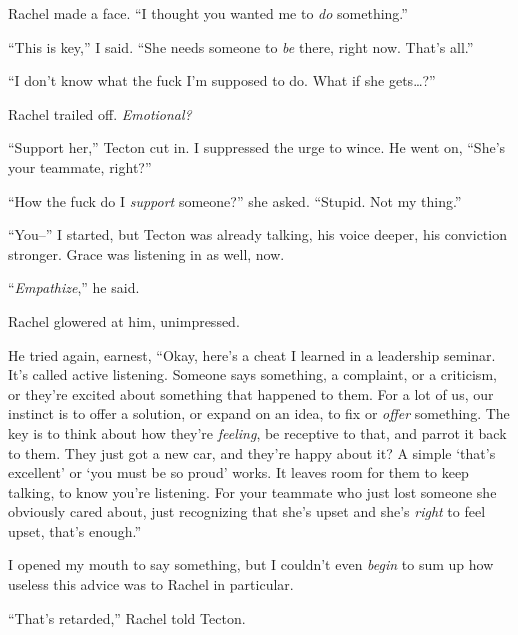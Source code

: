 Rachel made a face.  ``I thought you wanted me to \emph{do} something.''



``This is key,'' I said.  ``She needs someone to \emph{be} there, right now.  That's all.''



``I don't know what the fuck I'm supposed to do.  What if she gets\ldots?''



Rachel trailed off.  \emph{Emotional?}



``Support her,'' Tecton cut in.  I suppressed the urge to wince.  He went on, ``She's your teammate, right?''



``How the fuck do I \emph{support }someone?'' she asked.  ``Stupid.  Not my thing.''



``You--'' I started, but Tecton was already talking, his voice deeper, his conviction stronger.  Grace was listening in as well, now.



``\emph{Empathize},'' he said.



Rachel glowered at him, unimpressed.



He tried again, earnest, ``Okay, here's a cheat I learned in a leadership seminar.  It's called active listening.  Someone says something, a complaint, or a criticism, or they're excited about something that happened to them.  For a lot of us, our instinct is to offer a solution, or expand on an idea, to fix or \emph{offer} something.  The key is to think about how they're \emph{feeling}, be receptive to that, and parrot it back to them.  They just got a new car, and they're happy about it?  A simple `that's excellent' or `you must be so proud' works.  It leaves room for them to keep talking, to know you're listening.  For your teammate who just lost someone she obviously cared about, just recognizing that she's upset and she's \emph{right} to feel upset, that's enough.''



I opened my mouth to say something, but I couldn't even \emph{begin }to sum up how useless this advice was to Rachel in particular.



``That's retarded,'' Rachel told Tecton.




